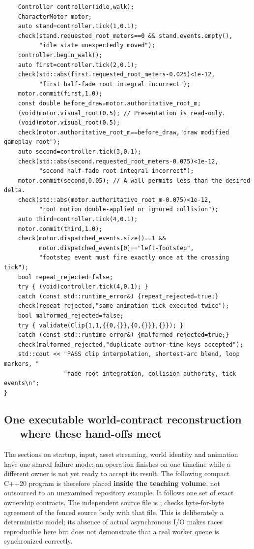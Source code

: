 \begin{verbatim}
    Controller controller(idle,walk);
    CharacterMotor motor;
    auto stand=controller.tick(1,0.1);
    check(stand.requested_root_meters==0 && stand.events.empty(),
          "idle state unexpectedly moved");
    controller.begin_walk();
    auto first=controller.tick(2,0.1);
    check(std::abs(first.requested_root_meters-0.025)<1e-12,
          "first half-fade root integral incorrect");
    motor.commit(first,1.0);
    const double before_draw=motor.authoritative_root_m;
    (void)motor.visual_root(0.5); // Presentation is read-only.
    (void)motor.visual_root(0.5);
    check(motor.authoritative_root_m==before_draw,"draw modified gameplay root");
    auto second=controller.tick(3,0.1);
    check(std::abs(second.requested_root_meters-0.075)<1e-12,
          "second half-fade root integral incorrect");
    motor.commit(second,0.05); // A wall permits less than the desired delta.
    check(std::abs(motor.authoritative_root_m-0.075)<1e-12,
          "root motion double-applied or ignored collision");
    auto third=controller.tick(4,0.1);
    motor.commit(third,1.0);
    check(motor.dispatched_events.size()==1 &&
          motor.dispatched_events[0]=="left-footstep",
          "footstep event must fire exactly once at the crossing tick");
    bool repeat_rejected=false;
    try { (void)controller.tick(4,0.1); }
    catch (const std::runtime_error&) {repeat_rejected=true;}
    check(repeat_rejected,"same animation tick executed twice");
    bool malformed_rejected=false;
    try { validate(Clip{1,1,{{0,{}},{0,{}}},{}}); }
    catch (const std::runtime_error&) {malformed_rejected=true;}
    check(malformed_rejected,"duplicate author-time keys accepted");
    std::cout << "PASS clip interpolation, shortest-arc blend, loop markers, "
                 "fade root integration, collision authority, tick events\n";
}
\end{verbatim}

\subsection{One executable world-contract reconstruction --- where these hand-offs meet}\label{06-engine-ii-ch040-one-executable-world-contract-reconstruction-where-these-hand-offs-meet}

\hypertarget{06-engine-ii-ch040-one-executable-world-contract-reconstruction-where-these-hand-offs-meet}{}

The sections on startup, input, asset streaming, world identity and animation have one shared failure mode: an operation finishes on one timeline while a different owner is not yet ready to accept its result. The following compact C++20 program is therefore placed \textbf{inside the teaching volume}, not outsourced to an unexamined repository example. It follows one set of exact ownership contracts. The independent source file is ;  checks byte-for-byte agreement of the fenced source body with that file. This is deliberately a deterministic model; its absence of actual asynchronous I/O makes races reproducible here but does not demonstrate that a real worker queue is synchronized correctly.

